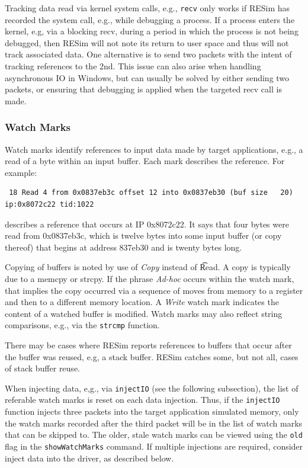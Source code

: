 \documentclass[titlepage]{article}
\begin{document}
Tracking data read via kernel system calls, e.g., {\tt recv} only works if RESim has recorded the system call, e.g., while debugging a process.
If a process enters the kernel, e.g, via a blocking recv, during a period in which the process is not being debugged, then RESim will not note its return
to user space and thus will not track associated data.  One alternative is to send two packets with the intent of tracking references to the 2nd.
This issue can also arise when handling asynchronous IO in Windows, but can usually be solved by either sending two packets, or ensuring that debugging
is applied when the targeted recv call is made.

\subsubsection{Watch Marks}
\label{watch-marks}
Watch marks identify references to input data made by target applications, e.g., a read of a byte within an input buffer.  Each mark describes the reference.  For example:

\begin{verbatim}
 18 Read 4 from 0x0837eb3c offset 12 into 0x0837eb30 (buf size   20)   ip:0x8072c22 tid:1022
\end{verbatim}
\noindent describes a reference that occurs at IP 0x8072c22.  It says that four bytes were read from 0x0837eb3c, which is twelve bytes into some input buffer
(or copy thereof) that begins at address 837eb30 and is twenty bytes long.

Copying of buffers is noted by use of \textit{Copy} instead of \t{Read}.  A copy is typically due to a memcpy or strcpy.  If the phrase \textit{Ad-hoc} occurs
within the watch mark, that implies the copy occurred via a sequence of moves from memory to a register and then to a different memory location.
A \textit{Write} watch mark indicates the content of a watched buffer is modified.  Watch marks may also reflect string comparisons, e.g., via the {\tt strcmp}
function.

There may be cases where RESim reports references to buffers that occur after the buffer was reused, e.g, a stack buffer.  RESim catches some, but not all,
cases of stack buffer reuse.

When injecting data, e,g., via {\tt injectIO} (see the following subsection), the list of referable watch marks is reset on each data injection.  Thus, if the {\tt injectIO} function injects
three packets into the target application simulated memory, only the watch marks recorded after the third packet will be in 
the list of watch marks that can be skipped to.  The older, stale watch marks can
be viewed using the {\tt old} flag in the {\tt showWatchMarks} command.  If multiple injections are required, consider inject data into the driver, as described below.
\end{document}
